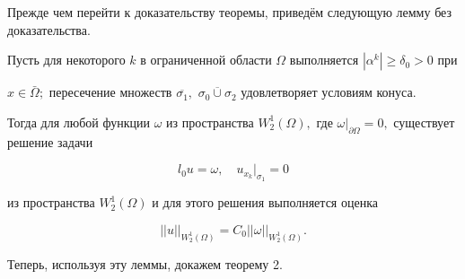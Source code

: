 \smallskip



Прежде чем перейти к доказательству теоремы, приведём следующую лемму \cite{khashimovl:bib:Kojan} без доказательства.



\smallskip



\begin{lemma} Пусть для некоторого $k$ в ограниченной области $\Omega$ выполняется $|\alpha^k|\geq\delta_0>0$ при

$x\in\bar{\Omega};$ пересечение множеств $\overline{\sigma_1},$ $\overline{\sigma_0\cup\sigma_2}$ удовлетворяет условиям конуса$.$

Тогда для любой функции $\omega $ из пространства $W_2^1(\Omega),$ где  $\omega|_{\partial\Omega}=0,$ существует решение задачи

$$

l_0u=\omega,\quad  u_{x_k}\big|_{\sigma_1}=0

$$

из пространства $W_2^1(\Omega)$ и  для этого решения выполняется оценка

$$

||u ||_{W_2^1(\Omega)}=C_0||\omega ||_{W_2^1(\Omega)}.

$$

\end{lemma}



\smallskip



Теперь, используя эту леммы, докажем теорему 2.



\smallskip



